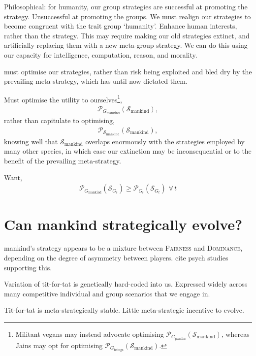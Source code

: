 \documentclass[twocolumn, aps, rmp, amsmath, amssymb, nofootinbib, superscriptaddress, longbibliography, floatfix, table-of-contents, eqsecnum]{revtex4-1}
\begin{document}
Philosophical: for humanity, our group strategies are successful at promoting the strategy. Unsuccessful at promoting the groups. We must realign our strategies to become congruent with the trait group `humanity'. Enhance human interests, rather than the strategy. This may require making our old strategies extinct, and artificially replacing them with a new meta-group strategy. We can do this using our capacity for intelligence, computation, reason, and morality.

must optimise our strategies, rather than risk being exploited and bled dry by the prevailing meta-strategy, which has until now dictated them.

Must optimise the utility to ourselves\footnote{Militant vegans may instead advocate optimising $\mathcal{P}_{G_\text{pandas}}(\mathcal{S}_\text{mankind})$, whereas Jains may opt for optimising $\mathcal{P}_{G_\text{beings}}(\mathcal{S}_\text{mankind})$.},
\begin{align}
	\mathcal{P}_{G_\text{mankind}}(\mathcal{S}_\text{mankind}),
\end{align}
rather than capitulate to optimising,
\begin{align}
	\mathcal{P}_{\mathcal{S}_\text{mankind}}(\mathcal{S}_\text{mankind}),
\end{align}
knowing well that $\mathcal{S}_\text{mankind}$ overlaps enormously with the strategies employed by many other species, in which case our extinction may be inconsequential or to the benefit of the prevailing meta-strategy.

Want,
\begin{align}
\mathcal{P}_{G_\text{mankind}}(\mathcal{S}_{G_t}) \geq \mathcal{P}_{G_t}(\mathcal{S}_{G_t})\,\,\forall\, t
\end{align}

\section{Can mankind strategically evolve?}

mankind's strategy appears to be a mixture between \textsc{Fairness} and \textsc{Dominance}, depending on the degree of asymmetry between players. cite psych studies supporting this.

Variation of tit-for-tat is genetically hard-coded into us. Expressed widely across many competitive individual and group scenarios that we engage in.

Tit-for-tat is meta-strategically stable. Little meta-strategic incentive to evolve.
\end{document}
